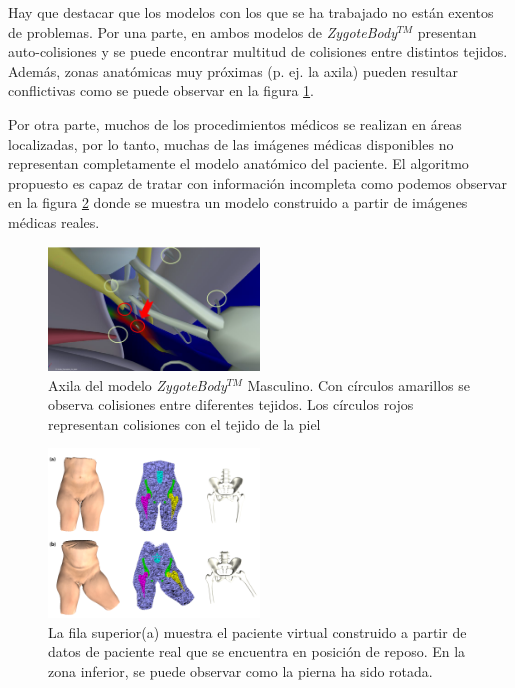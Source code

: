 Hay que destacar que los modelos con los que se ha trabajado no están exentos de problemas. Por una parte, en ambos modelos de \emph{ZygoteBody}$^{TM}$ presentan auto-colisiones y se puede encontrar multitud de colisiones entre distintos tejidos. Además, zonas anatómicas muy próximas (p. ej. la axila) pueden resultar conflictivas como se puede observar en la figura \ref{fig:zygoteproblems}. 

Por otra parte, muchos de los procedimientos médicos se realizan en áreas localizadas, por lo tanto, muchas de las imágenes médicas disponibles no representan completamente el modelo anatómico del paciente. El algoritmo propuesto es capaz de tratar con información incompleta como podemos observar en la figura \ref{fig:patient} donde se muestra un modelo construido a partir de imágenes médicas reales.

\begin{figure}[h]
   \centering
    \includegraphics[width=0.5\textwidth]{IMG/zygoteproblems.png}
    \caption{Axila del modelo \emph{ZygoteBody}$^{TM}$ Masculino. Con círculos amarillos se observa colisiones entre diferentes tejidos. Los círculos rojos representan colisiones con el tejido de la piel  }
   \label{fig:zygoteproblems}
\end{figure}


\begin{figure}[h]
   \centering
    \includegraphics[width=0.5\textwidth]{IMG/patient.png}
    \caption{ La fila superior(a) muestra el paciente virtual construido a partir de datos de paciente real que se encuentra en posición de reposo. En la zona inferior, se puede observar como la pierna ha sido rotada.
    }
   \label{fig:patient}
\end{figure}
%


